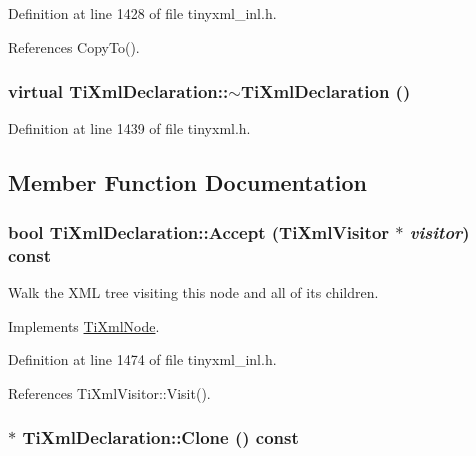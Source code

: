 Definition at line 1428 of file tinyxml\_\-inl.h.

References CopyTo().\hypertarget{class_ti_xml_declaration_ad5f37a673f4c507fd7e550470f9cec25}{
\subsubsection[{$\sim$TiXmlDeclaration}]{\setlength{\rightskip}{0pt plus 5cm}virtual TiXmlDeclaration::$\sim$TiXmlDeclaration ()}}
\label{class_ti_xml_declaration_ad5f37a673f4c507fd7e550470f9cec25}


Definition at line 1439 of file tinyxml.h.

\subsection{Member Function Documentation}
\hypertarget{class_ti_xml_declaration_ab6a6b178161ba9abc2c35058de689864}{
\subsubsection[{Accept}]{\setlength{\rightskip}{0pt plus 5cm}bool TiXmlDeclaration::Accept ({\bf TiXmlVisitor} $\ast$ {\em visitor}) const}}
\label{class_ti_xml_declaration_ab6a6b178161ba9abc2c35058de689864}
Walk the XML tree visiting this node and all of its children. 

Implements \hyperlink{class_ti_xml_node_acc0f88b7462c6cb73809d410a4f5bb86}{TiXmlNode}.

Definition at line 1474 of file tinyxml\_\-inl.h.

References TiXmlVisitor::Visit().\hypertarget{class_ti_xml_declaration_aff8231266d735943d8a7514a9c9822b9}{
\subsubsection[{Clone}]{ $\ast$ TiXmlDeclaration::Clone () const}}
\label{class_ti_xml_declaration_aff8231266d735943d8a7514a9c9822b9}


